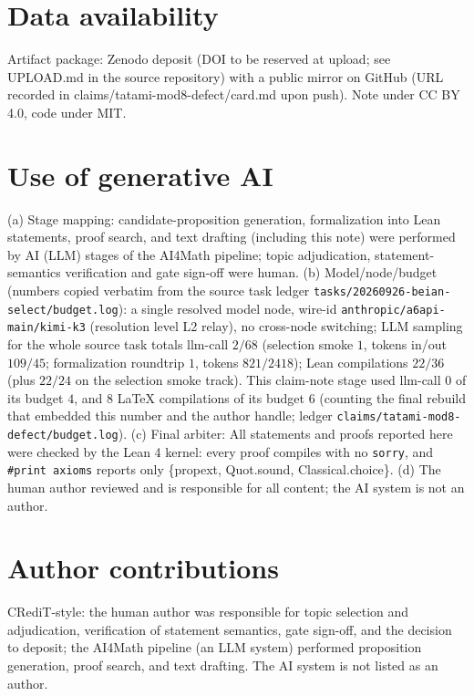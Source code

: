 \documentclass[11pt]{article}
\begin{document}
\section*{Data availability}

Artifact package: Zenodo deposit (DOI to be reserved at upload; see
UPLOAD.md in the source repository) with a public mirror on GitHub (URL recorded in
claims/tatami-mod8-defect/card.md upon push). Note under CC BY 4.0, code
under MIT.

\section*{Use of generative AI}

(a) Stage mapping: candidate-proposition generation, formalization into Lean
statements, proof search, and text drafting (including this note) were
performed by AI (LLM) stages of the AI4Math pipeline; topic adjudication,
statement-semantics verification and gate sign-off were human. (b)
Model/node/budget (numbers copied verbatim from the source task ledger
\texttt{tasks/20260926-beian-select/budget.log}): a single resolved model
node, wire-id \texttt{anthropic/a6api-main/kimi-k3} (resolution level L2
relay), no cross-node switching; LLM sampling for the whole source task
totals llm-call $2/68$ (selection smoke $1$, tokens in/out $109/45$;
formalization roundtrip $1$, tokens $821/2418$); Lean compilations $22/36$
(plus $22/24$ on the selection smoke track). This claim-note stage used
llm-call $0$ of its budget $4$, and $8$ LaTeX compilations of its budget $6$
(counting the final rebuild that embedded this number and the author handle;
ledger \texttt{claims/tatami-mod8-defect/budget.log}). (c) Final
arbiter: All statements and proofs reported here were checked by the Lean 4
kernel: every proof compiles with no \texttt{sorry}, and \texttt{\#print
axioms} reports only \{propext, Quot.sound, Classical.choice\}. (d) The
human author reviewed and is responsible for all content; the AI system is
not an author.

\section*{Author contributions}

CRediT-style: the human author was responsible for topic selection and
adjudication, verification of statement semantics, gate sign-off, and the
decision to deposit; the AI4Math pipeline (an LLM system) performed
proposition generation, proof search, and text drafting. The AI system is
not listed as an author.
\end{document}
